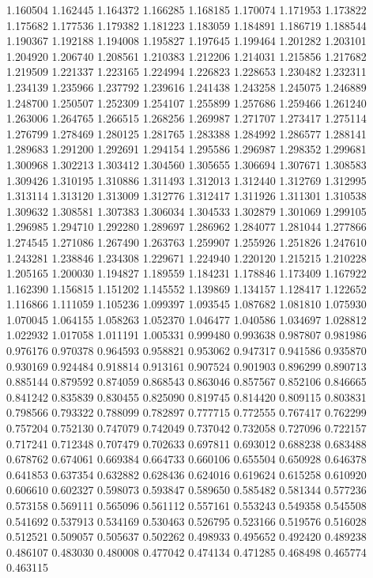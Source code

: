 1.160504
1.162445
1.164372
1.166285
1.168185
1.170074
1.171953
1.173822
1.175682
1.177536
1.179382
1.181223
1.183059
1.184891
1.186719
1.188544
1.190367
1.192188
1.194008
1.195827
1.197645
1.199464
1.201282
1.203101
1.204920
1.206740
1.208561
1.210383
1.212206
1.214031
1.215856
1.217682
1.219509
1.221337
1.223165
1.224994
1.226823
1.228653
1.230482
1.232311
1.234139
1.235966
1.237792
1.239616
1.241438
1.243258
1.245075
1.246889
1.248700
1.250507
1.252309
1.254107
1.255899
1.257686
1.259466
1.261240
1.263006
1.264765
1.266515
1.268256
1.269987
1.271707
1.273417
1.275114
1.276799
1.278469
1.280125
1.281765
1.283388
1.284992
1.286577
1.288141
1.289683
1.291200
1.292691
1.294154
1.295586
1.296987
1.298352
1.299681
1.300968
1.302213
1.303412
1.304560
1.305655
1.306694
1.307671
1.308583
1.309426
1.310195
1.310886
1.311493
1.312013
1.312440
1.312769
1.312995
1.313114
1.313120
1.313009
1.312776
1.312417
1.311926
1.311301
1.310538
1.309632
1.308581
1.307383
1.306034
1.304533
1.302879
1.301069
1.299105
1.296985
1.294710
1.292280
1.289697
1.286962
1.284077
1.281044
1.277866
1.274545
1.271086
1.267490
1.263763
1.259907
1.255926
1.251826
1.247610
1.243281
1.238846
1.234308
1.229671
1.224940
1.220120
1.215215
1.210228
1.205165
1.200030
1.194827
1.189559
1.184231
1.178846
1.173409
1.167922
1.162390
1.156815
1.151202
1.145552
1.139869
1.134157
1.128417
1.122652
1.116866
1.111059
1.105236
1.099397
1.093545
1.087682
1.081810
1.075930
1.070045
1.064155
1.058263
1.052370
1.046477
1.040586
1.034697
1.028812
1.022932
1.017058
1.011191
1.005331
0.999480
0.993638
0.987807
0.981986
0.976176
0.970378
0.964593
0.958821
0.953062
0.947317
0.941586
0.935870
0.930169
0.924484
0.918814
0.913161
0.907524
0.901903
0.896299
0.890713
0.885144
0.879592
0.874059
0.868543
0.863046
0.857567
0.852106
0.846665
0.841242
0.835839
0.830455
0.825090
0.819745
0.814420
0.809115
0.803831
0.798566
0.793322
0.788099
0.782897
0.777715
0.772555
0.767417
0.762299
0.757204
0.752130
0.747079
0.742049
0.737042
0.732058
0.727096
0.722157
0.717241
0.712348
0.707479
0.702633
0.697811
0.693012
0.688238
0.683488
0.678762
0.674061
0.669384
0.664733
0.660106
0.655504
0.650928
0.646378
0.641853
0.637354
0.632882
0.628436
0.624016
0.619624
0.615258
0.610920
0.606610
0.602327
0.598073
0.593847
0.589650
0.585482
0.581344
0.577236
0.573158
0.569111
0.565096
0.561112
0.557161
0.553243
0.549358
0.545508
0.541692
0.537913
0.534169
0.530463
0.526795
0.523166
0.519576
0.516028
0.512521
0.509057
0.505637
0.502262
0.498933
0.495652
0.492420
0.489238
0.486107
0.483030
0.480008
0.477042
0.474134
0.471285
0.468498
0.465774
0.463115
